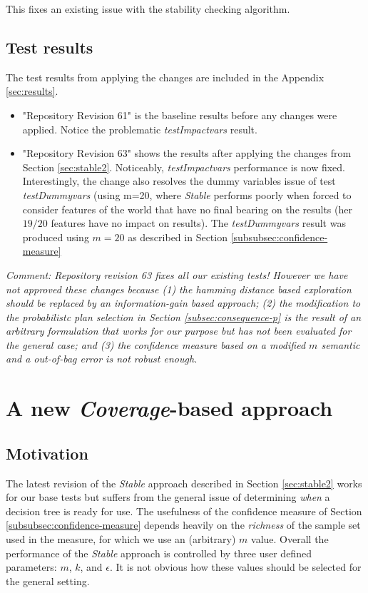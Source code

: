 \documentclass[a4paper]{article}
\newcommand{\st}{\emph{Stable}\xspace}
\newcommand{\cov}{\emph{Coverage}\xspace}
\newcommand{\tiv}{\emph{testImpactvars}\xspace}
\newcommand{\dt}{{decision tree}\xspace}
\begin{document}
This fixes an existing issue with the stability checking algorithm.

\subsection{Test results}
\label{sec:results-stable2}

The test results from applying the changes are included in the Appendix \ref{sec:results}.
\begin{itemize}
\item "Repository Revision 61" is the baseline results before any changes were applied. Notice the problematic \tiv result.
\item "Repository Revision 63" shows the results after applying the changes from Section \ref{sec:stable2}. Noticeably, \tiv performance is now fixed. Interestingly, the change also resolves the dummy variables issue of test \textit{testDummyvars} (using m=20, where \st performs poorly when forced to consider features of the world that have no final bearing on the results (her $19/20$ features have no impact on results). The \textit{testDummyvars} result was produced using $m=20$ as described in Section \ref{subsubsec:confidence-measure}
\end{itemize}

\textit{Comment: Repository revision 63 fixes all our existing tests! However we have not approved these changes because (1) the hamming distance based exploration should be replaced by an information-gain based approach; (2) the modification to the probabilistc plan selection in Section \ref{subsec:consequence-p} is the result of an arbitrary formulation that works for our purpose but has not been evaluated for the general case; and (3) the confidence measure based on a modified $m$ semantic and a out-of-bag error is not robust enough. }


\section{A new {\cov}-based approach}
\label{sec:coverage1}
\subsection{Motivation}

The latest revision of the \st approach described in Section \ref{sec:stable2} works for our base tests but suffers from the general issue of determining \textit{when} a \dt is ready for use. The usefulness of the confidence measure of Section \ref{subsubsec:confidence-measure} depends heavily on the \textit{richness} of the sample set used in the measure, for which we use an (arbitrary) $m$ value. Overall the performance of the \st approach is controlled by three user defined parameters: $m$, $k$, and $\epsilon$. It is not obvious how these values should be selected for the general setting.
\end{document}
